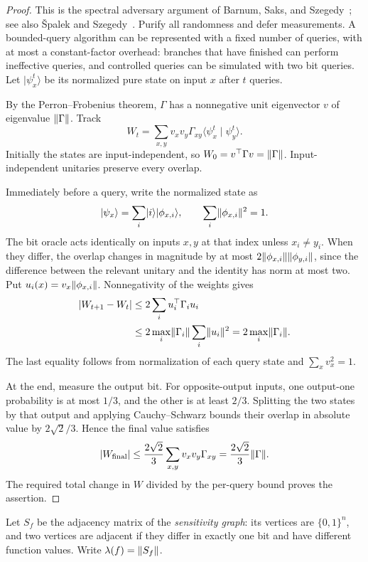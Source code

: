 \documentclass[11pt]{article}
\theoremstyle{definition}
\newcommand{\bits}{\{0,1\}}
\DeclarePairedDelimiter{\norm}{\lVert}{\rVert}
\DeclarePairedDelimiter{\abs}{\lvert}{\rvert}
\begin{document}
\begin{proof}
This is the spectral adversary argument of
Barnum, Saks, and Szegedy~\cite{BSS03}; see also
\v{S}palek and Szegedy~\cite{SpalekSzegedy06}.
Purify all randomness and defer measurements. A bounded-query algorithm
can be represented with a fixed number of queries, with at most a
constant-factor overhead: branches that have finished can perform
ineffective queries, and controlled queries can be simulated with two
bit queries. Let $\lvert\psi_x^t\rangle$ be its normalized pure state
on input $x$ after $t$ queries.

By the Perron--Frobenius theorem, $\Gamma$ has a nonnegative unit
eigenvector $v$ of eigenvalue $\norm{\Gamma}$. Track
\[
 W_t=\sum_{x,y}v_xv_y\Gamma_{xy}
            \langle\psi_x^t\mid\psi_y^t\rangle.
\]
Initially the states are input-independent, so
$W_0=v^\top\Gamma v=\norm{\Gamma}$. Input-independent unitaries
preserve every overlap.

Immediately before a query, write the normalized state as
\[
 \lvert\psi_x\rangle=\sum_i\lvert i\rangle\lvert\phi_{x,i}\rangle,
 \qquad \sum_i\norm{\phi_{x,i}}^2=1.
\]
The bit oracle acts identically
on inputs $x,y$ at that index unless $x_i\ne y_i$. When they differ,
the overlap changes in magnitude by at most
$2\norm{\phi_{x,i}}\norm{\phi_{y,i}}$, since the difference between
the relevant unitary and the identity has norm at most two. Put
$u_i(x)=v_x\norm{\phi_{x,i}}$. Nonnegativity of the weights gives
\begin{align*}
 \abs{W_{t+1}-W_t}
 &\le2\sum_i u_i^\top\Gamma_i u_i\\
 &\le2\max_i\norm{\Gamma_i}\sum_i\norm{u_i}^2
  =2\max_i\norm{\Gamma_i}.
\end{align*}
The last equality follows from normalization of each query state and
$\sum_xv_x^2=1$.

At the end, measure the output bit. For opposite-output inputs, one
output-one probability is at most $1/3$, and the other is at least
$2/3$. Splitting the two states by that output and applying
Cauchy--Schwarz bounds their overlap in absolute value by
$2\sqrt2/3$. Hence the final value satisfies
\[
 \abs{W_{\mathrm{final}}}
 \le\frac{2\sqrt2}{3}\sum_{x,y}v_xv_y\Gamma_{xy}
 =\frac{2\sqrt2}{3}\norm{\Gamma}.
\]
The required total change in $W$ divided by the per-query bound proves
the assertion.
\end{proof}

Let $S_f$ be the adjacency matrix of the \emph{sensitivity graph}: its
vertices are $\bits^n$, and two vertices are adjacent if they differ
in exactly one bit and have different function values. Write
$\lambda(f)=\norm{S_f}$.
\end{document}
